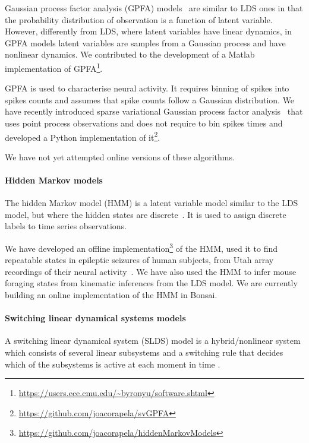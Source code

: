 Gaussian process factor analysis (GPFA) models~\citep{yuEtAl09} are similar to
LDS ones in that the probability distribution of observation is a function of
latent variable. However, differently from LDS, where latent variables have
linear dynamics, in GPFA models latent variables are samples from a Gaussian
process and have nonlinear dynamics. We contributed to the development of a
Matlab implementation of
GPFA\footnote{\url{https://users.ece.cmu.edu/~byronyu/software.shtml}}.

GPFA is used to characterise neural activity. It requires binning of spikes
into spikes counts and assumes that spike counts follow a Gaussian
distribution. We have recently introduced sparse variational Gaussian process
factor analysis~\citep[svGPFA,][]{dunckerAndSahani18} that uses point process observations
and does not require to bin spikes times and developed a Python implementation
of it\footnote{\url{https://github.com/joacorapela/svGPFA}}.

We have not yet attempted online versions of these algorithms.

\paragraph{Hidden Markov models}

The hidden Markov model (HMM) is a latent variable model similar to the LDS
model, but where the hidden states are discrete~\citep[][Chapter 13]{bishop06}. It is
used to assign discrete labels to time series observations.

We have developed an offline
implementation\footnote{\url{https://github.com/joacorapela/hiddenMarkovModels}}
of the HMM, used it to find repeatable states in epileptic seizures of human
subjects, from Utah array recordings of their neural
activity~\citep{rapelaAndTodorov19-epilepsy-hmm}. We have also used the HMM to
infer mouse foraging states from kinematic inferences from the LDS model. We
are currently building an online implementation of the HMM in Bonsai.

\paragraph{Switching linear dynamical systems models}

A switching linear dynamical system (SLDS) model is a hybrid/nonlinear system which
consists of several linear subsystems and a switching rule that decides which
of the subsystems is active at each moment in time \citep[Section
18.6]{murphy12}.

